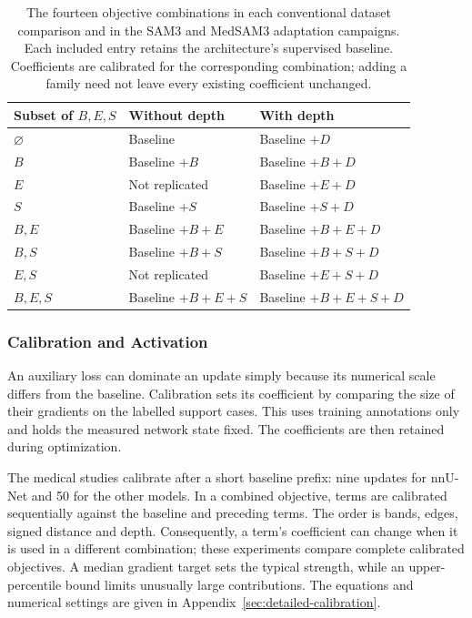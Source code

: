 \begin{table}[htbp]
\centering
\small
{}
\renewcommand{\arraystretch}{1.2}
\begin{tabular}{@{}P{4.6cm}P{4.6cm}P{4.6cm}@{}}
\hline
Subset of $B,E,S$ & Without depth & With depth \\
\hline
$\varnothing$ & Baseline & Baseline $+D$ \\
$B$ & Baseline $+B$ & Baseline $+B+D$ \\
$E$ & Not replicated & Baseline $+E+D$ \\
$S$ & Baseline $+S$ & Baseline $+S+D$ \\
$B,E$ & Baseline $+B+E$ & Baseline $+B+E+D$ \\
$B,S$ & Baseline $+B+S$ & Baseline $+B+S+D$ \\
$E,S$ & Not replicated & Baseline $+E+S+D$ \\
$B,E,S$ & Baseline $+B+E+S$ & Baseline $+B+E+S+D$ \\
\hline
\end{tabular}
\caption{The fourteen objective combinations in each conventional dataset
comparison and in the SAM3 and MedSAM3 adaptation campaigns.
Each included entry retains the architecture's supervised
baseline. Coefficients are calibrated for the corresponding combination;
adding a family need not leave every existing coefficient unchanged.}
\label{tab:constraint-combinations}
\end{table}

\subsubsection{Calibration and Activation}
\label{sec:calibration-methods}

An auxiliary loss can dominate an update simply because its numerical
scale differs from the baseline. Calibration sets its coefficient by
comparing the size of their gradients on the labelled support cases.
This uses training annotations only and holds the measured network state
fixed. The coefficients are then retained during optimization.

The medical studies calibrate after a short baseline prefix: nine updates
for nnU-Net and 50 for the other models. In a combined objective, terms
are calibrated sequentially against the baseline and preceding terms.
The order is bands, edges, signed distance and depth. Consequently, a
term's coefficient can change when it is used in a different combination;
these experiments compare complete calibrated objectives. A median
gradient target sets the typical strength, while an upper-percentile
bound limits unusually large contributions. The equations and numerical
settings are given in Appendix~\ref{sec:detailed-calibration}.

